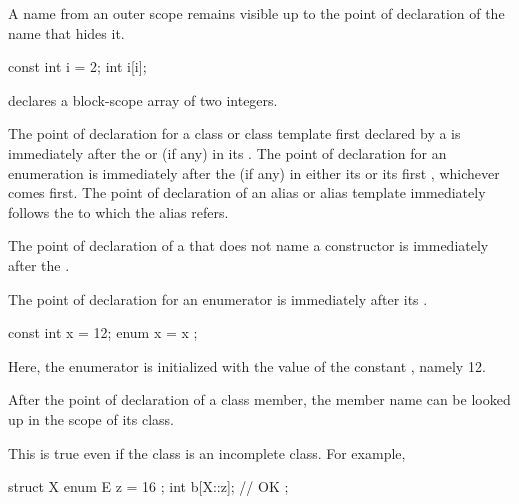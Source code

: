 \pnum
\begin{note}
%
A name from an outer scope remains visible up
to the point of declaration of the name that hides it. \begin{example}

\begin{codeblock}
const int  i = 2;
{ int  i[i]; }
\end{codeblock}

declares a block-scope array of two integers. \end{example} \end{note}

\pnum
The point of declaration for a class or class template first declared by a
 is immediately after the  or
 (if any) in its .
The point of declaration for an enumeration is
immediately after the  (if any) in either its
 or its first
, whichever comes first.
The point of declaration of an alias or alias template immediately
follows the  to which the
alias refers.

\pnum
The point of declaration of a  that does not name a
constructor is immediately after the .

\pnum
{}%
The point of declaration for an enumerator is immediately after its
. \begin{example}

\begin{codeblock}
const int x = 12;
{ enum { x = x }; }
\end{codeblock}

Here, the enumerator  is initialized with the value of the
constant , namely 12. \end{example}

\pnum
After the point of declaration of a class member, the member name can be
looked up in the scope of its class. \begin{note}
%
This is true even if the class is an incomplete class. For example,

\begin{codeblock}
struct X {
  enum E { z = 16 };
  int b[X::z];      // OK
};
\end{codeblock}
\end{note}

